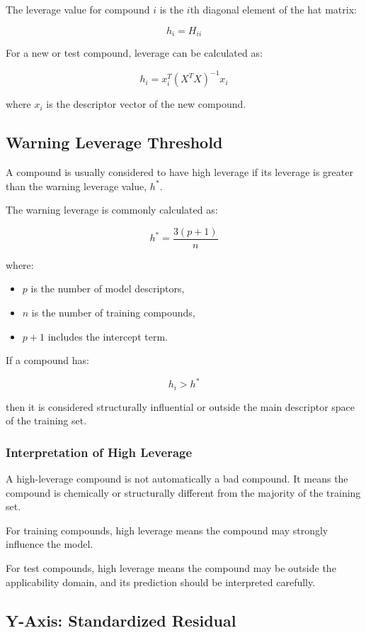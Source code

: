 \documentclass[11pt]{report}
\newenvironment{Important note}{\begin{quote}\color{red}\textbf{Important note:} }{\end{quote}}
\begin{document}
The leverage value for compound $i$ is the $i$th diagonal element of the hat matrix:

\[
h_i = H_{ii}
\]

For a new or test compound, leverage can be calculated as:

\[
h_i = x_i^T(X^TX)^{-1}x_i
\]

where $x_i$ is the descriptor vector of the new compound.

\subsection{Warning Leverage Threshold}

A compound is usually considered to have high leverage if its leverage is greater than the warning leverage value, $h^*$.

The warning leverage is commonly calculated as:

\[
h^* = \frac{3(p+1)}{n}
\]

where:

\begin{itemize}[leftmargin=*]
    \item $p$ is the number of model descriptors,
    \item $n$ is the number of training compounds,
    \item $p+1$ includes the intercept term.
\end{itemize}

If a compound has:

\[
h_i > h^*
\]

then it is considered structurally influential or outside the main descriptor space of the training set.

\subsubsection*{Interpretation of High Leverage}

A high-leverage compound is not automatically a bad compound. It means the compound is chemically or structurally different from the majority of the training set.

For training compounds, high leverage means the compound may strongly influence the model.

For test compounds, high leverage means the compound may be outside the applicability domain, and its prediction should be interpreted carefully.

\subsection{Y-Axis: Standardized Residual}
\end{document}
